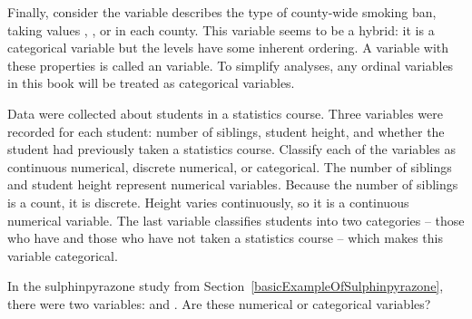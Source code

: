 Finally, consider the  variable describes the type of county-wide smoking ban, taking values , , or  in each county. This variable seems to be a hybrid: it is a categorical variable but the levels have some inherent ordering. A variable with these properties is called an  variable. To simplify analyses, any ordinal variables in this book will be treated as categorical variables.


\begin{example}{Data were collected about students in a statistics course. Three variables were recorded for each student: number of siblings, student height, and whether the student had previously taken a statistics course. Classify each of the variables as continuous numerical, discrete numerical, or categorical.}
The number of siblings and student height represent numerical variables. Because the number of siblings is a count, it is discrete. Height varies continuously, so it is a continuous numerical variable. The last variable classifies students into two categories -- those who have and those who have not taken a statistics course -- which makes this variable categorical.
\end{example}

\begin{exercise}
In the sulphinpyrazone study  from Section~\ref{basicExampleOfSulphinpyrazone}, there were two variables:  and . Are these numerical or categorical variables?
\end{exercise}



